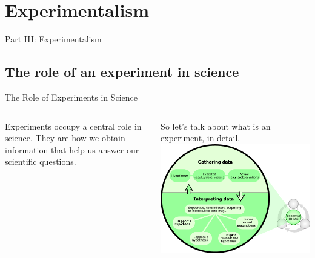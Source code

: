 
\section{Experimentalism}
\begin{frame}
  \begin{center}
    Part III: Experimentalism
  \end{center}
\end{frame}

\subsection{The role of an experiment in science}

\begin{frame}{The Role of Experiments in Science}
  \begin{columns}
      Experiments occupy a central role in science.
      They are how we obtain information that help us answer our scientific
      questions.

      \bigskip

      So let's talk about what is an experiment, in detail.
      \includegraphics[width=1\textwidth]{../img/understandingscience_zoom2}
  \end{columns}
\end{frame}

